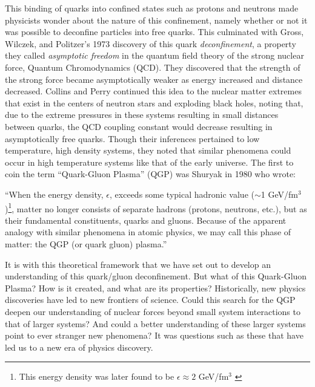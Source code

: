 This binding of quarks into confined states such as protons and neutrons made physicists wonder about the nature of this confinement, namely whether or not it was possible to deconfine particles into free quarks. This culminated with Gross, Wilczek\citep{PhysRevD.8.3633}, and Politzer's\citep{PhysRevLett.30.1346} 1973 discovery of this quark \textit{deconfinement}, a property they called \textit{asymptotic freedom} in the quantum field theory of the strong nuclear force, Quantum Chromodynamics (QCD). They discovered that the strength of the strong force became asymptotically weaker as energy increased and distance decreased. Collins and Perry\citep{Collins:1974ky} continued this idea to the nuclear matter extremes that exist in the centers of neutron stars and exploding black holes, noting that, due to the extreme pressures in these systems resulting in small distances between quarks, the QCD coupling constant would decrease resulting in asymptotically free quarks. Though their inferences pertained to low temperature, high density systems, they noted that similar phenomena could occur in high temperature systems like that of the early universe. The first to coin the term ``Quark-Gluon Plasma'' (QGP) was Shuryak in 1980 \citep{Shuryak:1980tp} who wrote: 

\begin{addmargin}[1.5em]{2em}``When the energy density, $\epsilon$, exceeds some typical hadronic value ($\sim$1 GeV/fm$^{3}$)\footnote{This energy density was later found to be $\epsilon \approx 2$ GeV/fm$^3$ \citep{Fries:2006pv}}, matter no longer consists of separate hadrons (protons, neutrons, etc.), but as their fundamental constituents, quarks and gluons. Because of the apparent analogy with similar phenomena in atomic physics, we may call this phase of matter: the QGP (or quark gluon) plasma.''
\end{addmargin}
 
It is with this theoretical framework that we have set out to develop an understanding of this quark/gluon deconfinement. But what of this Quark-Gluon Plasma? How is it created, and what are its properties? Historically, new physics discoveries have led to new frontiers of science. Could this search for the QGP deepen our understanding of nuclear forces beyond small system interactions to that of larger systems? And could a better understanding of these larger systems point to ever stranger new phenomena? It was questions such as these that have led us to a new era of physics discovery.

